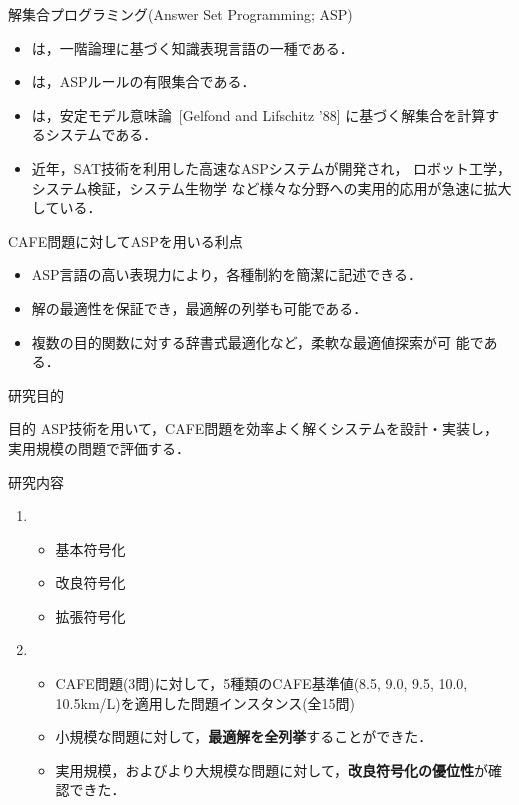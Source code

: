 \documentclass[dvipdfmx, 11pt]{beamer}
\begin{document}
\begin{frame}{解集合プログラミング(Answer Set Programming; ASP)}
 \begin{itemize}
 \item {}は，一階論理に基づく知識表現言語の一種である．
 \item {}は，ASPルールの有限集合である．
 \item {}は，安定モデル意味論~[Gelfond and Lifschitz '88]
   に基づく解集合を計算するシステムである．
 \item 近年，SAT技術を利用した高速なASPシステムが開発され，
   ロボット工学，システム検証，システム生物学
   など様々な分野への実用的応用が急速に拡大している．
 \end{itemize}
\vfill
 \begin{alertblock}{CAFE問題に対してASPを用いる利点}
   \begin{itemize} 
    \item ASP言語の高い表現力により，各種制約を簡潔に記述できる．
    \item 解の最適性を保証でき，最適解の列挙も可能である．
    \item 複数の目的関数に対する辞書式最適化など，柔軟な最適値探索が可
      能である．
   \end{itemize}
 \end{alertblock}
\end{frame}
\begin{frame}{研究目的}
  \begin{alertblock}{目的}
    ASP技術を用いて，CAFE問題を効率よく解くシステムを設計・実装し，
    実用規模の問題で評価する．
  \end{alertblock}
  \vfill
  \begin{block}{研究内容}
    \begin{enumerate}
    \item {}
      \begin{itemize}
      \item 基本符号化
      \item 改良符号化
      \item 拡張符号化
      \end{itemize}
    \item {}
      \begin{itemize}
      \item CAFE問題(3問)に対して，5種類のCAFE基準値(8.5, 9.0, 9.5,
        10.0, 10.5km/L)を適用した問題インスタンス(全15問)       
      \item 小規模な問題に対して，\textbf{最適解を全列挙}することができた．
      \item 実用規模，およびより大規模な問題に対して，\textbf{改良符号化の優位性}が確認できた．
      \end{itemize}
  \end{enumerate}
 \end{block}
\end{frame}
\end{document}
